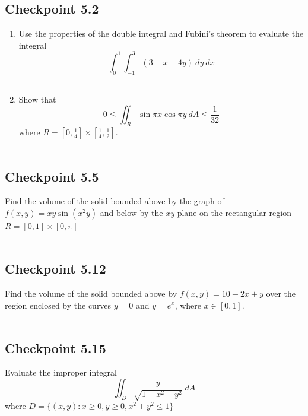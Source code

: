 \documentclass[]{mangos-musings}
\begin{document}
\subsection{Checkpoint 5.2}
\begin{enumerate}[label=(\alph*)]
  \item Use the properties of the double integral and Fubini's theorem to evaluate the integral
  \[
    \int_{0}^{1}\int_{-1}^{3} (3 - x + 4y) \ dy \ dx 
  \]
  \begin{align*}
    \\ \\
  \end{align*}
  \item Show that 
  \[
    0 \le \iint_R \sin \pi x \cos \pi y \ dA \le \frac{1}{32}
  \]
  where $R = \left[0, \frac{1}{4}\right]\times \left[\frac{1}{4}, \frac{1}{2}\right]$.
  \begin{align*}
    \\ \\
  \end{align*}
\end{enumerate}
%
%
%
%
\subsection{Checkpoint 5.5}
Find the volume of the solid bounded above by the graph of $f(x, y) = xy\sin (x^2 y)$ and below by the $xy$-plane on the rectangular region $R = [0,1]\times [0, \pi]$ 
\begin{align*}
  \\ \\
\end{align*}
%
%
%
%
\subsection{Checkpoint 5.12}
Find the volume of the solid bounded above by $f(x, y) = 10 - 2x + y$ over the region enclosed by the curves $y = 0$ and $y = e^x$, where $x\in [0, 1]$.
\begin{align*}
  \\ \\
\end{align*}
%
%
%
%
\newpage
\subsection{Checkpoint 5.15}
Evaluate the improper integral 
\[\iint_D \frac{y}{\sqrt{1 - x^2 - y^2}} \ dA \]
where $D = \{(x, y) : x\ge 0, y \ge 0, x^2 + y^2 \le 1\}$
\begin{align*}
  \\ \\
\end{align*}
%
%
%
%
\end{document}
